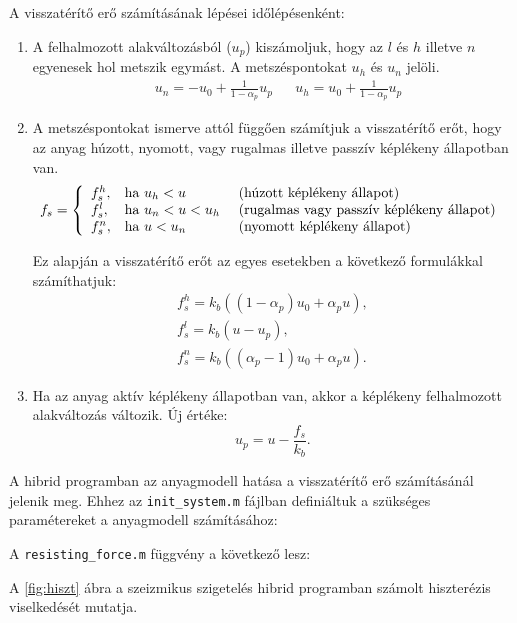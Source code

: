 A visszatérítő erő számításának lépései időlépésenként:
\begin{enumerate}
\item A felhalmozott alakváltozásból ($u_p$) kiszámoljuk, hogy az $l$ és $h$ illetve $n$ egyenesek hol metszik egymást. A metszéspontokat $u_{h}$ és $u_n$ jelöli.
\begin{align*}
& u_n = -u_0+\frac{1}{1-\alpha_p}u_p & & u_h = u_0+\frac{1}{1-\alpha_p}u_p 
\end{align*}
\item A metszéspontokat ismerve attól függően számítjuk a visszatérítő erőt, hogy az anyag húzott, nyomott, vagy rugalmas illetve passzív képlékeny állapotban van.
\begin{equation*}
f_s = \left\{ \begin{array}{lll} f_s^h, & $ha $  u_h < u & $ (húzott képlékeny állapot)$ \\
								 f_s^l, & $ha $  u_n < u < u_h & $ (rugalmas vagy passzív képlékeny állapot)$ \\ 
								 f_s^n, & $ha $  u < u_n & $ (nyomott képlékeny állapot)$ \end{array}\right.
 \end{equation*}
 
 Ez alapján a visszatérítő erőt az egyes esetekben a következő formulákkal számíthatjuk:
 \begin{align*}
 & f_s^h = k_b((1-\alpha_p)u_0 + \alpha_pu), & \\
 & f_s^l = k_b(u-u_p), & \\
 & f_s^n = k_b((\alpha_p-1)u_0 + \alpha_pu). &
 \end{align*}
\item Ha az anyag aktív képlékeny állapotban van, akkor a képlékeny felhalmozott alakváltozás változik. Új értéke:
\begin{equation*}
u_p = u - \frac{f_s}{k_b}.
\end{equation*}
\end{enumerate}


A hibrid programban az anyagmodell hatása a visszatérítő erő számításánál jelenik meg. Ehhez az  \verb|init_system.m| fájlban definiáltuk a szükséges paramétereket a anyagmodell számításához:
 
A \verb|resisting_force.m| függvény a következő lesz:
 
 
A \ref{fig:hiszt} ábra a szeizmikus szigetelés hibrid programban számolt hiszterézis viselkedését mutatja.
 
